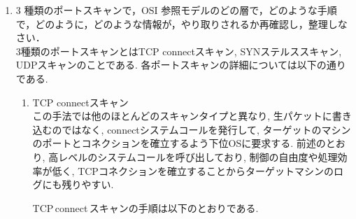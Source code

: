 \begin{enumerate}[label=(\arabic*.),leftmargin=*]
\begin{enumerate}[label=\arabic*., leftmargin=*]
        \item 3 種類のポートスキャンで，OSI 参照モデルのどの層で，どのような手順で，どのように，どのような情報が，やり取りされるか再確認し，整理しなさい．\\
        
            \quad
            3種類のポートスキャンとはTCP connectスキャン, SYNステルススキャン, UDPスキャンのことである.
            各ポートスキャンの詳細については以下の通りである.

            \vspace{\baselineskip}

            \begin{enumerate}

                \item TCP connectスキャン\\

                    \quad
                    この手法では他のほとんどのスキャンタイプと異なり, 
                    生パケットに書き込むのではなく, connectシステムコールを発行して, 
                    ターゲットのマシンのポートとコネクションを確立するよう下位OSに要求する. 
                    前述のとおり, 高レベルのシステムコールを呼び出しており, 制御の自由度や処理効率が低く, 
                    TCPコネクションを確立することからターゲットマシンのログにも残りやすい\cite{nmap_man_port_scanning_techniques}.

                    \quad
                    TCP\,connect\,スキャンの手順は以下のとおりである.

                    \vspace{\baselineskip}

\end{enumerate}
\end{enumerate}
\end{enumerate}
